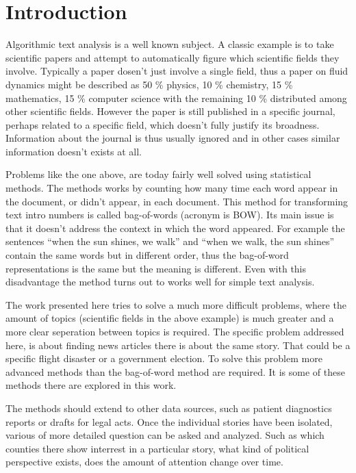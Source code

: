 \chapter{Introduction}

Algorithmic text analysis is a well known subject.
A classic example is to take scientific papers and attempt to automatically figure which scientific fields they involve.
Typically a paper dosen't just involve a single field, thus a paper on fluid dynamics might be described as 50 \% physics, 10 \% chemistry, 15 \% mathematics, 15 \% computer science with the remaining 10 \% distributed among other scientific fields.
However the paper is still published in a specific journal, perhaps related to a specific field, which doesn't fully justify its broadness.
Information about the journal is thus usually ignored and in other cases similar information doesn't exists at all.

Problems like the one above, are today fairly well solved\cite{missing source} using statistical methods.
The methods works by counting how many time each word appear in the document, or didn't appear, in each document.
This method for transforming text intro numbers is called bag-of-words (acronym is BOW).
Its main issue is that it doesn't address the context in which the word appeared.
For example the sentences ``when the sun shines, we walk'' and ``when we walk, the sun shines'' contain the same words but in different order, thus the bag-of-word representations is the same but the meaning is different.
Even with this disadvantage the method turns out to works well for simple text analysis.

The work presented here tries to solve a much more difficult problems, where the amount of topics (scientific fields in the above example) is much greater and a more clear seperation between topics is required.
The specific problem addressed here, is about finding news articles there is about the same story.
That could be a specific flight disaster or a government election.
To solve this problem more advanced methods than the bag-of-word method are required.
It is some of these methods there are explored in this work.

The methods should extend to other data sources, such as patient diagnostics reports or drafts for legal acts.
Once the individual stories have been isolated, various of more detailed question can be asked and analyzed. Such as which counties there show interrest in a particular story, what kind of political perspective exists, does the amount of attention change over time.
